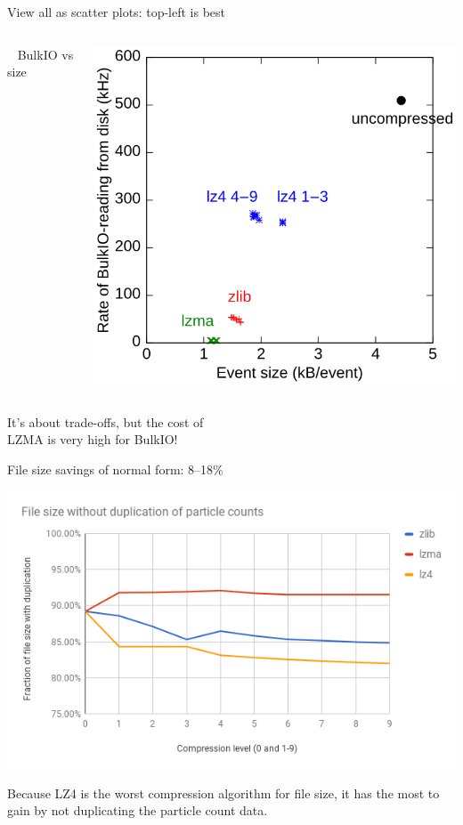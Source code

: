 \documentclass{beamer}
\begin{document}
\begin{frame}{View all as scatter plots: top-left is best}
\begin{columns}
\mbox{ } \hfill BulkIO vs size \hfill \mbox{ }

\includegraphics[width=\linewidth]{bulk.png}
\end{columns}

\vspace{-2\baselineskip}
It's about trade-offs, but the cost of \\ LZMA is very high for BulkIO!
\end{frame}

\begin{frame}{File size savings of normal form: 8--18\%}
\begin{center}
\includegraphics[width=\linewidth]{avoiding-duplication.png}
\end{center}

Because LZ4 is the worst compression algorithm for file size, it has the most to gain by not duplicating the particle count data.
\end{frame}
\end{document}
